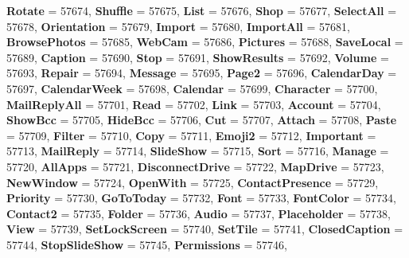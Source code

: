 \begin{DoxyCompactItemize}
{\bfseries Rotate} = 57674, 
{\bfseries Shuffle} = 57675, 
{\bfseries List} = 57676, 
{\bfseries Shop} = 57677, 
\newline
{\bfseries Select\+All} = 57678, 
{\bfseries Orientation} = 57679, 
{\bfseries Import} = 57680, 
{\bfseries Import\+All} = 57681, 
\newline
{\bfseries Browse\+Photos} = 57685, 
{\bfseries Web\+Cam} = 57686, 
{\bfseries Pictures} = 57688, 
{\bfseries Save\+Local} = 57689, 
\newline
{\bfseries Caption} = 57690, 
{\bfseries Stop} = 57691, 
{\bfseries Show\+Results} = 57692, 
{\bfseries Volume} = 57693, 
\newline
{\bfseries Repair} = 57694, 
{\bfseries Message} = 57695, 
{\bfseries Page2} = 57696, 
{\bfseries Calendar\+Day} = 57697, 
\newline
{\bfseries Calendar\+Week} = 57698, 
{\bfseries Calendar} = 57699, 
{\bfseries Character} = 57700, 
{\bfseries Mail\+Reply\+All} = 57701, 
\newline
{\bfseries Read} = 57702, 
{\bfseries Link} = 57703, 
{\bfseries Account} = 57704, 
{\bfseries Show\+Bcc} = 57705, 
\newline
{\bfseries Hide\+Bcc} = 57706, 
{\bfseries Cut} = 57707, 
{\bfseries Attach} = 57708, 
{\bfseries Paste} = 57709, 
\newline
{\bfseries Filter} = 57710, 
{\bfseries Copy} = 57711, 
{\bfseries Emoji2} = 57712, 
{\bfseries Important} = 57713, 
\newline
{\bfseries Mail\+Reply} = 57714, 
{\bfseries Slide\+Show} = 57715, 
{\bfseries Sort} = 57716, 
{\bfseries Manage} = 57720, 
\newline
{\bfseries All\+Apps} = 57721, 
{\bfseries Disconnect\+Drive} = 57722, 
{\bfseries Map\+Drive} = 57723, 
{\bfseries New\+Window} = 57724, 
\newline
{\bfseries Open\+With} = 57725, 
{\bfseries Contact\+Presence} = 57729, 
{\bfseries Priority} = 57730, 
{\bfseries Go\+To\+Today} = 57732, 
\newline
{\bfseries Font} = 57733, 
{\bfseries Font\+Color} = 57734, 
{\bfseries Contact2} = 57735, 
{\bfseries Folder} = 57736, 
\newline
{\bfseries Audio} = 57737, 
{\bfseries Placeholder} = 57738, 
{\bfseries View} = 57739, 
{\bfseries Set\+Lock\+Screen} = 57740, 
\newline
{\bfseries Set\+Tile} = 57741, 
{\bfseries Closed\+Caption} = 57744, 
{\bfseries Stop\+Slide\+Show} = 57745, 
{\bfseries Permissions} = 57746, 
\newline

\end{DoxyCompactItemize}
